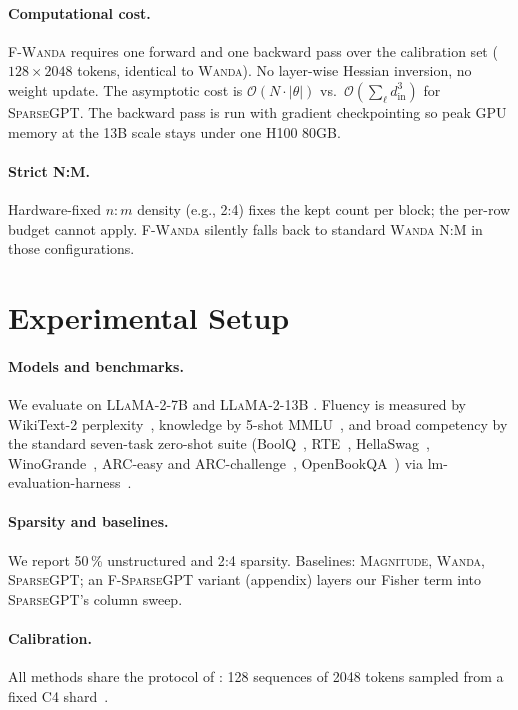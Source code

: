 \documentclass[11pt]{article}
\newcommand{\fwanda}{\textsc{F-Wanda}}
\newcommand{\wanda}{\textsc{Wanda}}
\newcommand{\sgpt}{\textsc{SparseGPT}}
\newcommand{\fsgpt}{\textsc{F-SparseGPT}}
\newcommand{\mag}{\textsc{Magnitude}}
\begin{document}
\paragraph{Computational cost.}
\fwanda{} requires one forward and one backward pass over the calibration
set ($128\times2048$ tokens, identical to \wanda{}). No layer-wise Hessian
inversion, no weight update. The asymptotic cost is
$\mathcal{O}(N \cdot |\theta|)$ vs.\ $\mathcal{O}(\sum_\ell d_\text{in}^3)$
for \sgpt. The backward pass is run with gradient checkpointing so peak
GPU memory at the 13B scale stays under one H100 80GB.

\paragraph{Strict N:M.}
Hardware-fixed $n{:}m$ density (e.g., 2{:}4) fixes the kept count per
block; the per-row budget cannot apply. \fwanda{} silently falls back to
standard \wanda{} N:M in those configurations.

\section{Experimental Setup}

\paragraph{Models and benchmarks.}
We evaluate on \textsc{LLaMA-2-7B} and \textsc{LLaMA-2-13B}
\citep{touvron2023llama2}. Fluency is measured by WikiText-2
perplexity~\citep{merity2017wikitext}, knowledge by 5-shot
MMLU~\citep{hendrycks2021mmlu}, and broad competency by the standard
seven-task zero-shot suite (BoolQ~\citep{clark2019boolq},
RTE~\citep{wang2018glue}, HellaSwag~\citep{zellers2019hellaswag},
WinoGrande~\citep{sakaguchi2021winogrande},
ARC-easy and ARC-challenge~\citep{clark2018arc},
OpenBookQA~\citep{mihaylov2018openbookqa})
via lm-evaluation-harness~\citep{gao2023lmeval}.

\paragraph{Sparsity and baselines.}
We report 50\,\% unstructured and 2{:}4 sparsity. Baselines: \mag,
\wanda, \sgpt; an \fsgpt{} variant (appendix) layers our Fisher term into
\sgpt's column sweep.

\paragraph{Calibration.}
All methods share the protocol of \citet{sun2024wanda}:
128 sequences of 2048 tokens sampled from a fixed C4
shard~\citep{raffel2020c4}.
\end{document}
